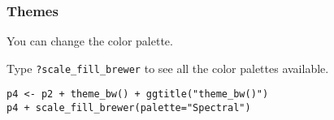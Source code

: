 \documentclass{beamer}
\begin{document}
	\begin{frame}[fragile]
		\frametitle{Themes}

		You can change the color palette.

		\vspace{2em}

		Type \verb|?scale_fill_brewer| to see all the color palettes available.

		\vspace{2em}

		\begin{exampleblock}{}
		\begin{BVerbatim}
p4 <- p2 + theme_bw() + ggtitle("theme_bw()")
p4 + scale_fill_brewer(palette="Spectral")
		\end{BVerbatim}
		\end{exampleblock}{}

	\end{frame}
\end{document}
